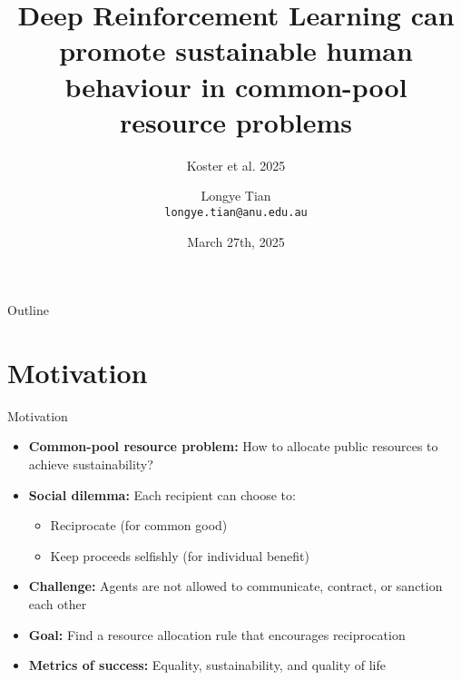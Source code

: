\documentclass[aspectratio=169]{beamer} %
\title[DRL]{Deep Reinforcement Learning can promote sustainable human behaviour in common-pool resource problems}
\subtitle{Koster et al. 2025}
\author[Longye]{Longye Tian \\ \texttt{longye.tian@anu.edu.au}}
\institute[ANU]{Australian National University\\ School of Economics}
\date{March 27th, 2025}
\begin{document}
\begin{frame}
  \titlepage
\end{frame}

\begin{frame}{Outline}
  \tableofcontents
\end{frame}

\section{Motivation}
\begin{frame}{Motivation}
\begin{itemize}
    \item \textbf{Common-pool resource problem:} How to allocate public resources to achieve sustainability?
    \item \textbf{Social dilemma:} Each recipient can choose to:
    \begin{itemize}
        \item Reciprocate (for common good)
        \item Keep proceeds selfishly (for individual benefit)
    \end{itemize}
    \item \textbf{Challenge:} Agents are not allowed to communicate, contract, or sanction each other
    \item \textbf{Goal:} Find a resource allocation rule that encourages reciprocation
    \item \textbf{Metrics of success:} Equality, sustainability, and quality of life
\end{itemize}
\end{frame}
\end{document}
